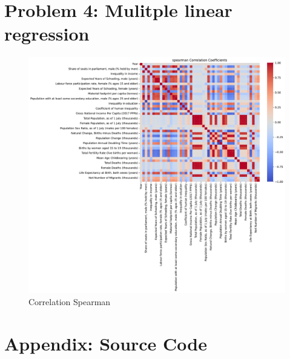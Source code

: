 \documentclass[a4paper]{article}
\begin{document}
\section*{Problem 4: Mulitple linear regression}

\begin{figure}[h]
  \begin{center}
    \includegraphics[width=\textwidth]{ola/spearman_correlation.pdf}
    \caption{Correlation Spearman}
    \label{fig:spearman_correlation}
  \end{center}
\end{figure}



\newpage


\printbibliography

\section*{Appendix: Source Code}




\end{document}
